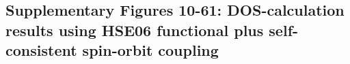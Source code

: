 \documentclass[journal=ancac3,manuscript=article,email=true,hyperref=true,keywords=true]{achemso}
\begin{document}
\subsection{Supplementary Figures 10-61: DOS-calculation results using HSE06 functional plus self-consistent spin-orbit coupling}



\pagebreak{}

\renewcommand\refname{Supplementary References}


%
%
\end{document}
